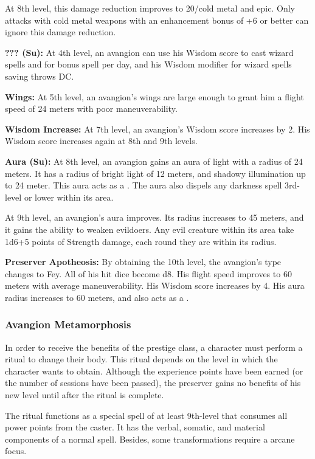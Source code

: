 {At 8th level, this damage reduction improves to 20/cold metal and epic. Only attacks with cold metal weapons with an enhancement bonus of +6 or better can ignore this damage reduction.

\textbf{??? (Su):} At 4th level, an avangion can use his Wisdom score to cast wizard spells and for bonus spell per day, and his Wisdom modifier for wizard spells saving throws DC.

\textbf{Wings:} At 5th level, an avangion's wings are large enough to grant him a flight speed of 24 meters with poor maneuverability.

\textbf{Wisdom Increase:} At 7th level, an avangion's Wisdom score increases by 2. His Wisdom score increases again at 8th and 9th levels.

\textbf{Aura (Su):} At 8th level, an avangion gains an aura of light with a radius of 24 meters. It has a radius of bright light of 12 meters, and shadowy illumination up to 24 meter. This aura acts as a . The aura also dispels any darkness spell 3rd-level or lower within its area.

At 9th level, an avangion's aura improves. Its radius increases to 45 meters, and it gains the ability to weaken evildoers. Any evil creature within its area take 1d6+5 points of Strength damage, each round they are within its radius.

\textbf{Preserver Apotheosis:} By obtaining the 10th level, the avangion's type changes to Fey. All of his hit dice become d8. His flight speed improves to 60 meters with average maneuverability. His Wisdom score increases by 4. His aura radius increases to 60 meters, and also acts as a .

\subsubsection{Avangion Metamorphosis}
\label{Avangion Metamorphosis}

In order to receive the benefits of the prestige class, a character must perform a ritual to change their body. This ritual depends on the level in which the character wants to obtain. Although the experience points have been earned (or the number of sessions have been passed), the preserver gains no benefits of his new level until after the ritual is complete.

The ritual functions as a special spell of at least 9th-level that consumes all power points from the caster. It has the verbal, somatic, and material components of a normal spell. Besides, some transformations require a arcane focus.

}
